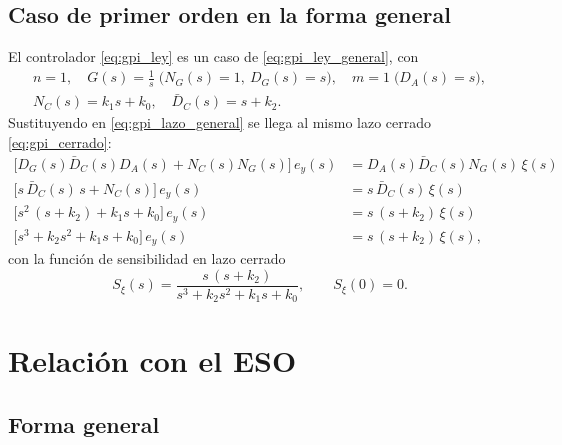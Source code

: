 \subsection{Caso de primer orden en la forma general}
\label{subsec:gpi_primer_orden}

El controlador \eqref{eq:gpi_ley} es un caso de \eqref{eq:gpi_ley_general}, con
\begin{equation}
\begin{gathered}
n = 1,\quad G(s) = \frac{1}{s}\;\bigl(N_G(s) = 1,\ D_G(s) = s\bigr),\quad
m = 1\;\bigl(D_A(s) = s\bigr),\\[4pt]
N_C(s) = k_1 s + k_0,\quad \bar{D}_C(s) = s + k_2 .
\end{gathered}
\end{equation}
Sustituyendo en \eqref{eq:gpi_lazo_general} se llega al mismo lazo cerrado
\eqref{eq:gpi_cerrado}:
\begin{align}
\bigl[D_G(s) \bar{D}_C(s) D_A(s) + N_C(s) N_G(s)\bigr]\,e_y(s) &= D_A(s) \bar{D}_C(s) N_G(s)\,\xi(s) \nonumber\\[4pt]
\bigl[s\,\bar{D}_C(s)\,s + N_C(s)\bigr]\,e_y(s) &= s\,\bar{D}_C(s)\,\xi(s) \nonumber\\[4pt]
\bigl[s^2\,(s + k_2) + k_1 s + k_0\bigr]\,e_y(s) &= s\,(s + k_2)\,\xi(s) \nonumber\\[4pt]
\bigl[s^3 + k_2 s^2 + k_1 s + k_0\bigr]\,e_y(s) &= s\,(s + k_2)\,\xi(s) ,
\end{align}
con la función de sensibilidad en lazo cerrado
\begin{equation}
S_{\xi}(s) = \frac{s\,(s + k_2)}{s^3 + k_2 s^2 + k_1 s + k_0} , \qquad S_{\xi}(0) = 0 .
\label{eq:gpi_S}
\end{equation}

\section{Relación con el ESO}
\label{sec:gpi_eso}

\subsection{Forma general}
\label{subsec:gpi_eso_general}

